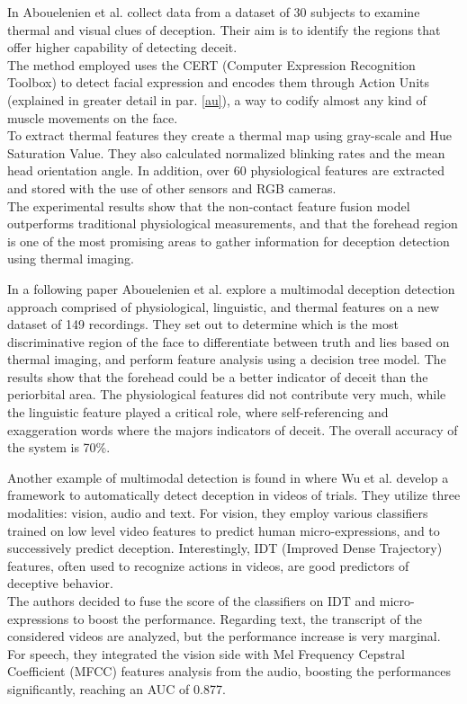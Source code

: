In \cite{Abouelenien:2016:ATV:2910674.2910682} Abouelenien et al. collect data from a dataset of 30 subjects to examine thermal and visual clues of deception. Their aim is to identify the regions that offer higher capability of detecting deceit. \\
The method employed uses the CERT (Computer Expression Recognition Toolbox) to detect facial expression and encodes them through Action Units (explained in greater detail in par. \ref{au}), a way to codify almost any kind of muscle movements on the face. \\
To extract thermal features they create a thermal map using gray-scale and Hue Saturation Value. They also calculated normalized blinking rates and the mean head orientation angle. In addition, over 60 physiological features are extracted and stored with the use of other sensors and RGB cameras. \\
The experimental results show that the non-contact feature fusion model outperforms traditional physiological measurements, and that the forehead region is one of the most promising areas to gather information for deception detection using thermal imaging.

In a following paper \cite{7782429} Abouelenien et al. explore a multimodal deception detection approach comprised of physiological, linguistic, and thermal features on a new dataset of 149 recordings. They set out to determine which is the most discriminative region of the face to differentiate between truth and lies based on thermal imaging, and perform feature analysis using a decision tree model. The results show that the forehead could be a better indicator of deceit than the periorbital area. The physiological features did not contribute very much, while the linguistic feature played a critical role, where self-referencing and exaggeration words where the majors indicators of deceit. The overall accuracy of the system is 70\%.

Another example of multimodal detection is found in \cite{DBLP:journals/corr/abs-1712-04415} where Wu et al. develop a framework to automatically detect deception in videos of trials. They utilize three modalities: vision, audio and text. For vision, they employ various classifiers trained on low level video features to predict human micro-expressions, and to successively predict deception. Interestingly, IDT (Improved Dense Trajectory) features, often used to recognize actions in videos, are good predictors of deceptive behavior. \\
The authors decided to fuse the score of the classifiers on IDT and micro-expressions to boost the performance. Regarding text, the transcript of the considered videos are analyzed, but the performance increase is very marginal. \\
For speech, they integrated the vision side with Mel Frequency Cepstral Coefficient (MFCC) features analysis from the audio, boosting the performances significantly, reaching an AUC of 0.877. 

